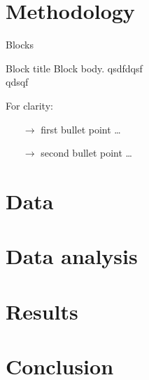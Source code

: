 \documentclass[nonav,sleutel]{beamer}
\begin{document}
\section{Methodology}
\begin{frame}{Blocks}
\begin{block}{Block title}
Block body.
qsdfdqsf\\
qdsqf\\
\end{block}
\begin{example}
For clarity:
\begin{itemize}
	\item[$\rightarrow$] first bullet point \ldots
	\item[$\rightarrow$] second bullet  point \ldots
\end{itemize}
\end{example}
\end{frame}

\section{Data}

\section{Data analysis}

\section{Results}

\section{Conclusion}
\end{document}
